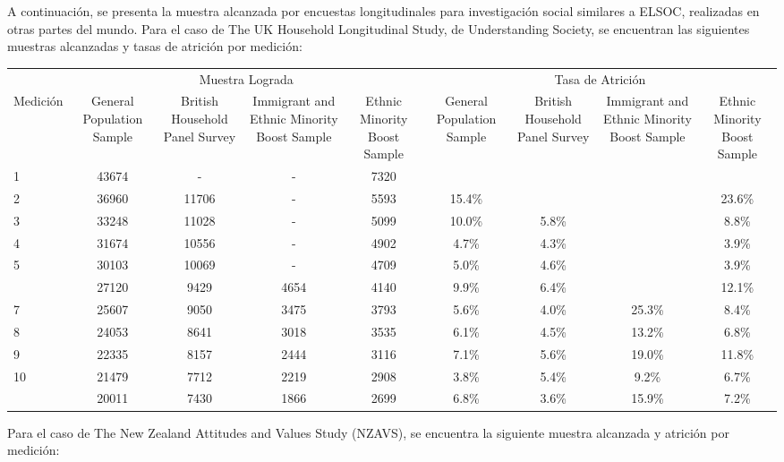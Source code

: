 \documentclass[
  12pt,
]{article}
\begin{document}
A continuación, se presenta la muestra alcanzada por encuestas longitudinales para investigación social similares a ELSOC, realizadas en otras partes del mundo. Para el caso de The UK Household Longitudinal Study, de Understanding Society, se encuentran las siguientes muestras alcanzadas y tasas de atrición por medición:

\begin{table}[H]
\centering
\begin{tabular}[t]{lcccccccc}
\toprule
\multicolumn{1}{c}{ } & \multicolumn{4}{c}{Muestra Lograda} & \multicolumn{4}{c}{Tasa de Atrición} \\
\cmidrule(l{3pt}r{3pt}){2-5} \cmidrule(l{3pt}r{3pt}){6-9}
Medición & General 
 Population 
 Sample & British 
 Household 
 Panel 
 Survey & Immigrant and 
 Ethnic Minority 
 Boost Sample & Ethnic Minority Boost Sample & General 
 Population 
 Sample & British 
 Household 
 Panel 
 Survey & Immigrant and 
 Ethnic Minority 
 Boost Sample & Ethnic Minority Boost Sample\\
\midrule
1 & 43674 & - & - & 7320 &  &  &  & \\
2 & 36960 & 11706 & - & 5593 & 15.4\% &  &  & 23.6\%\\
3 & 33248 & 11028 & - & 5099 & 10.0\% & 5.8\% &  & 8.8\%\\
4 & 31674 & 10556 & - & 4902 & 4.7\% & 4.3\% &  & 3.9\%\\
5 & 30103 & 10069 & - & 4709 & 5.0\% & 4.6\% &  & 3.9\%\\
\addlinespace
6 & 27120 & 9429 & 4654 & 4140 & 9.9\% & 6.4\% &  & 12.1\%\\
7 & 25607 & 9050 & 3475 & 3793 & 5.6\% & 4.0\% & 25.3\% & 8.4\%\\
8 & 24053 & 8641 & 3018 & 3535 & 6.1\% & 4.5\% & 13.2\% & 6.8\%\\
9 & 22335 & 8157 & 2444 & 3116 & 7.1\% & 5.6\% & 19.0\% & 11.8\%\\
10 & 21479 & 7712 & 2219 & 2908 & 3.8\% & 5.4\% & 9.2\% & 6.7\%\\
\addlinespace
11 & 20011 & 7430 & 1866 & 2699 & 6.8\% & 3.6\% & 15.9\% & 7.2\%\\
\bottomrule
\end{tabular}
\end{table}

Para el caso de The New Zealand Attitudes and Values Study (NZAVS), se encuentra la siguiente muestra alcanzada y atrición por medición:
\end{document}
